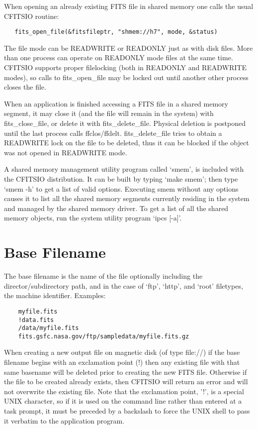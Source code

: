 \documentclass[11pt]{book}
\begin{document}
When opening an already existing FITS file in shared memory one calls
the usual CFITSIO routine:

\begin{verbatim}
   fits_open_file(&fitsfileptr, "shmem://h7", mode, &status)
\end{verbatim}
The file mode can be READWRITE or READONLY just as with disk files.
More than one process can operate on READONLY mode files at the same
time.  CFITSIO supports proper filelocking (both in READONLY and
READWRITE modes), so calls to fits\_open\_file may be locked out until
another other process closes the file.

When an application is finished accessing a FITS file in a shared
memory segment, it may close it  (and the file will remain in the
system) with fits\_close\_file, or delete it with fits\_delete\_file.
Physical deletion is postponed until the last process calls
ffclos/ffdelt.  fits\_delete\_file tries to obtain a READWRITE lock on
the file to be deleted, thus it can be blocked if the object was not
opened in READWRITE mode.

A shared memory management utility program called `smem', is included
with the CFITSIO distribution.  It can be built by typing `make smem';
then type `smem -h' to get a list of valid options.  Executing smem
without any options causes it to list all the shared memory segments
currently residing in the system and managed by the shared memory
driver. To get a list of all the shared memory objects, run the system
utility program `ipcs  [-a]'.


\section{Base Filename}

The base filename is the name of the file optionally including the
director/subdirectory path, and in the case of `ftp', `http', and `root'
filetypes, the machine identifier.  Examples:

\begin{verbatim}
    myfile.fits
    !data.fits
    /data/myfile.fits
    fits.gsfc.nasa.gov/ftp/sampledata/myfile.fits.gz
\end{verbatim}

When creating a new output file on magnetic disk (of type file://) if
the base filename begins with an exclamation point (!) then any
existing file with that same basename will be deleted prior to creating
the new FITS file.  Otherwise if the file to be created already exists,
then CFITSIO will return an error and will not overwrite the existing
file.  Note  that the exclamation point,  '!', is a special UNIX character,
so if it is used  on the command line rather than entered at a task
prompt, it must be  preceded by a backslash to force the UNIX
shell to pass it verbatim to the application program.
\end{document}
